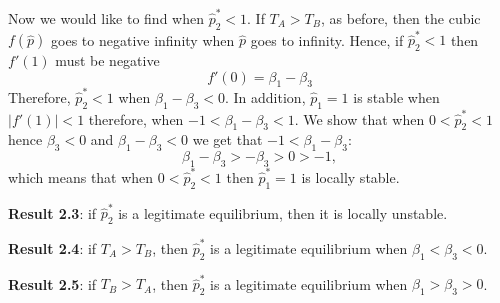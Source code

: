 \documentclass[12pt]{extarticle}
\begin{document}
Now we would like to find when $\hat{p}^*_2<1$.
If $T_A>T_B$, as before, then the cubic $f(\hat{p})$ goes to negative infinity when $\hat{p}$ goes to infinity.
Hence, if $\hat{p}^*_2<1$ then $f'(1)$ must be negative %
\begin{equation} \label{eq:derivative_of_phattag-phat_p=1}
  f'(0) = \beta_1 - \beta_3
\end{equation}
Therefore, $\hat{p}^*_2<1$ when $\beta_1-\beta_3<0$.
In addition, $\hat{p}_1=1$ is stable when $|f'(1)|<1$ therefore, when $-1<\beta_1-\beta_3<1$. 
We show that when $0<\hat{p}^*_2<1$ hence $\beta_3<0$ and $\beta_1-\beta_3<0$ we get that $-1<\beta_1-\beta_3$: %
\begin{equation} \label{eq:beta1-beta3-condition}
 \beta_1 - \beta_3 > - \beta_3 > 0 > -1 ,
\end{equation}
which means that when $0<\hat{p}^*_2<1$ then $\hat{p}^*_1=1$ is locally stable.

\textbf{Result 2.3}: if $\hat{p}^*_2$ is a legitimate equilibrium, then it is locally unstable.

\textbf{Result 2.4}: if $T_A>T_B$, then $\hat{p}^*_2$ is a legitimate equilibrium when $\beta_1<\beta_3<0$.

\textbf{Result 2.5}: if $T_B>T_A$, then $\hat{p}^*_2$ is a legitimate equilibrium when $\beta_1>\beta_3>0$.
\end{document}
